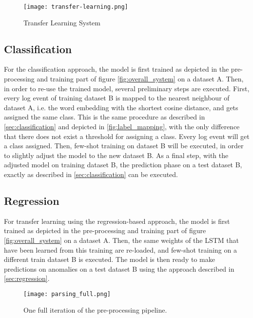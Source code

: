 \begin{figure}[H]
	\centering
	\texttt{[image: transfer-learning.png]}
	\caption{Transfer Learning System}
	\label{fig:transfer_learning_system}
\end{figure}

\subsection{Classification \label{sec:transfer_classification}}
For the classification approach, the model is first trained as depicted in the pre-processing and training part of figure \ref{fig:overall_system} on a dataset A. Then, in order to re-use the trained model, several preliminary steps are executed. First, every log event of training dataset B is mapped to the nearest neighbour of dataset A, i.e. the word embedding with the shortest cosine distance, and gets assigned the same class. This is the same procedure as described in \ref{sec:classification} and depicted in \ref{fig:label_mapping}, with the only difference that there does not exist a threshold for assigning a class. Every log event will get a class assigned. Then, few-shot training on dataset B will be executed, in order to slightly adjust the model to the new dataset B. As a final step, with the adjusted model on training dataset B, the prediction phase on a test dataset B, exactly as described in \ref{sec:classification} can be executed.

\subsection{Regression \label{sec:transfer_regression}}
For transfer learning using the regression-based approach, the model is first trained as depicted in the pre-processing and training part of figure \ref{fig:overall_system} on a dataset A. Then, the same weights of the LSTM that have been learned from this training are re-loaded, and few-shot training on a different train dataset B is executed. The model is then ready to make predictions on anomalies on a test dataset B using the approach described in \ref{sec:regression}.



\begin{figure}[htb]
  \centering
  \texttt{[image: parsing\_full.png]}\\
  \caption{One full iteration of the pre-processing pipeline.}
  \label{fig:full_preprocessing_pipeline}
\end{figure}







